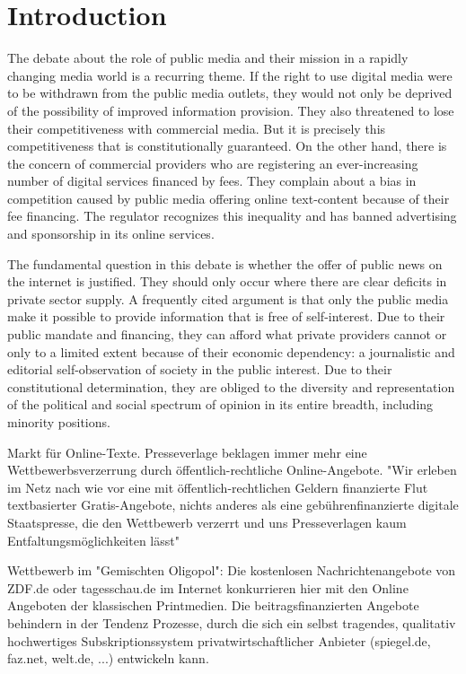 \documentclass[12pt,a4paper,notitlepage]{article}
\begin{document}
\section{Introduction}

The debate about the role of public media and their mission in a rapidly changing media world is a recurring theme. If the right to use digital media were to be withdrawn from the public media outlets, they would not only be deprived of the possibility of improved information provision. They also threatened to lose their competitiveness with commercial media. But it is precisely this competitiveness that is constitutionally guaranteed. On the other hand, there is the concern of commercial providers who are registering an ever-increasing number of digital services financed by fees. They complain about a bias in competition caused by public media offering online text-content because of their fee financing. The regulator recognizes this inequality and has banned advertising and sponsorship in its online services. 

The fundamental question in this debate is whether the offer of public news on the internet is justified. They should only occur where there are clear deficits in private sector supply. A frequently cited argument is that only the public media make it possible to provide information that is free of self-interest. Due to their public mandate and financing, they can afford what private providers cannot or only to a limited extent because of their economic dependency: a journalistic and editorial self-observation of society in the public interest. Due to their constitutional determination, they are obliged to the diversity and representation of the political and social spectrum of opinion in its entire breadth, including minority positions.


Markt für Online-Texte.
Presseverlage beklagen immer mehr eine Wettbewerbsverzerrung durch öffentlich-rechtliche Online-Angebote. "Wir erleben im Netz nach wie vor eine mit öffentlich-rechtlichen Geldern finanzierte Flut textbasierter Gratis-Angebote, nichts anderes als eine gebührenfinanzierte digitale Staatspresse, die den Wettbewerb verzerrt und uns Presseverlagen kaum Entfaltungsmöglichkeiten lässt" %

Wettbewerb im "Gemischten Oligopol": Die kostenlosen Nachrichtenangebote von ZDF.de oder tagesschau.de im Internet konkurrieren hier mit den Online Angeboten der klassischen Printmedien. Die beitragsfinanzierten Angebote behindern in der Tendenz Prozesse, durch die sich ein selbst tragendes, qualitativ hochwertiges Subskriptionssystem privatwirtschaftlicher Anbieter (spiegel.de, faz.net, welt.de, ...) entwickeln kann. 
 
\end{document}
